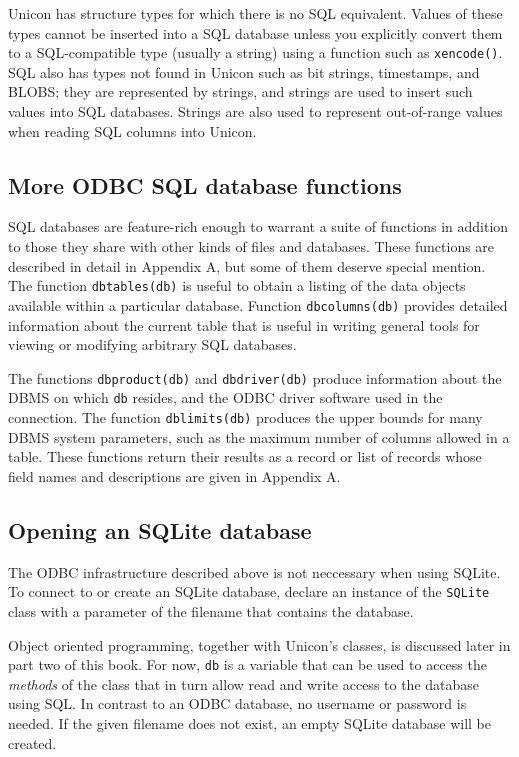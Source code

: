 Unicon has structure types for which there is no SQL equivalent. Values
of these types cannot be inserted into a SQL database unless you
explicitly convert them to a SQL-compatible type (usually a string)
using a function such as \texttt{xencode()}.
SQL also has types not found in Unicon such as bit
strings, timestamps, and BLOBS; they are represented
by strings, and strings are used to insert such values into SQL
databases. Strings are also used to represent out-of-range values when
reading SQL columns into Unicon.

\subsection*{More ODBC SQL database functions}

SQL databases are feature-rich enough to warrant a suite
of functions in addition to those they
share with other kinds of files and databases. These functions are
described in detail in Appendix A, but some of them deserve special
mention. The function \texttt{dbtables(db)} is useful to obtain a
listing of the data objects available within a particular database.
Function \texttt{dbcolumns(db)} provides detailed information about the
current table that is useful in writing general tools for viewing or
modifying arbitrary SQL databases.

The functions \texttt{dbproduct(db)} and \texttt{dbdriver(db)} produce
information about the DBMS on which \texttt{db} resides, and the
ODBC driver software used in the connection.
The function \texttt{dblimits(db)} produces the upper bounds for many
DBMS system parameters, such as the maximum number of columns allowed
in a table. These functions return their results as
a record or list of records whose field names and descriptions
are given in Appendix A.

\subsection*{Opening an SQLite database}
The ODBC infrastructure described above is not neccessary when using SQLite.
To connect to or create an SQLite database, declare an instance of the
\texttt{SQLite} class with a parameter of the filename that contains the
database.

\noindent
Object oriented programming, together with Unicon's classes, is discussed
later in part two of this book. For now, \texttt{db} is a variable that
can be used to access the {\em methods\/} of the class that in turn allow
read and write access to the database using SQL. In contrast to an ODBC
database, no username or password is needed.  If the given filename does
not exist, an empty SQLite database will be created.

